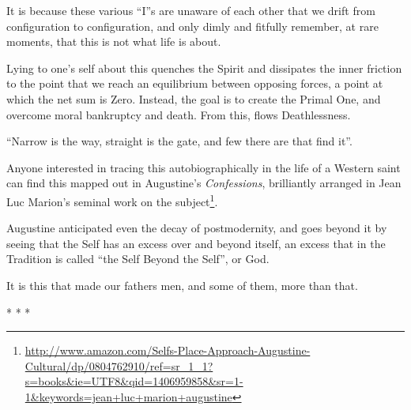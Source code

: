 It is because these various ``I''s are unaware of each other that we drift from configuration to configuration, and only dimly and fitfully remember, at rare moments, that this is not what life is about.

Lying to one's self about this quenches the Spirit and dissipates the inner friction to the point that we reach an equilibrium between opposing forces, a point at which the net sum is Zero. Instead, the goal is to create the Primal One, and overcome moral bankruptcy and death. From this, flows Deathlessness.

``Narrow is the way, straight is the gate, and few there are that find it''.

Anyone interested in tracing this autobiographically in the life of a Western saint can find this mapped out in Augustine's \emph{Confessions}, brilliantly arranged in Jean Luc Marion's seminal work on the subject\footnote{\url{http://www.amazon.com/Selfs-Place-Approach-Augustine-Cultural/dp/0804762910/ref=sr\_1\_1?s=books&ie=UTF8&qid=1406959858&sr=1-1&keywords=jean+luc+marion+augustine}}.

Augustine anticipated even the decay of postmodernity, and goes beyond it by seeing that the Self has an excess over and beyond itself, an excess that in the Tradition is called ``the Self Beyond the Self'', or God.

It is this that made our fathers men, and some of them, more than that.



\begin{center}* * *\end{center}

